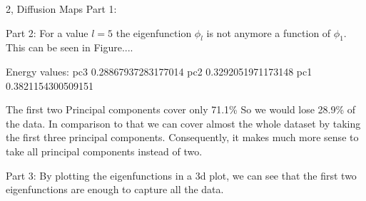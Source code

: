\documentclass[10pt,a4paper]{article}
\begin{document}
\begin{task}{2, Diffusion Maps}
Part 1:

Part 2: 
For a value $l=5$ the eigenfunction $\phi_l$ is not anymore a function of $\phi_1$. This can be seen in Figure....

Energy values:  
pc3 0.28867937283177014  
pc2 0.3292051971173148  
pc1 0.3821154300509151 

The first two Principal components cover only 71.1\% So we would lose 28.9\% of the data.
In comparison to that we can cover almost the whole dataset by taking the first three principal components. Consequently, it makes much more sense to take all principal components instead of two. 

Part 3:
By plotting the eigenfunctions in a 3d plot, we can see that the first two eigenfunctions are enough to capture all the data.
\end{task}
\end{document}
